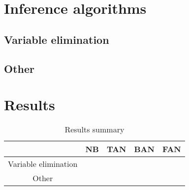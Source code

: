 \documentclass[twoside,twocolumn]{article}
\begin{document}

\section{Inference algorithms}

\subsection{Variable elimination}

\subsection{Other}


\section{Results}

\begin{table}[h]
  \caption{Results summary}
  \begin{tabular}{|c|c|c|l|l|}
  \hline
                       & NB & TAN & BAN & FAN \\ \hline
  Variable elimination &    &     &     &     \\ \hline
  Other                &    &     &     &     \\ \hline
  \end{tabular}
\end{table}

\end{document}
